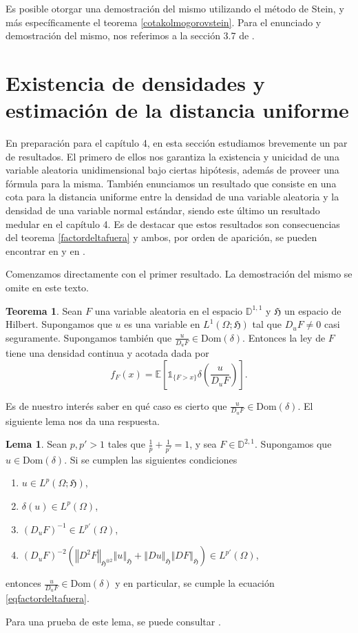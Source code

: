 \documentclass[letterpaper,twoside,12pt]{book}
\newcommand{\D}{\mathbb{D}}
\newcommand{\E}{\mathbb{E}}
\newcommand{\1}{\mathds{1}}
\newcommand{\norm}[1]{\left\Vert #1 \right\Vert}
\theoremstyle{definition}
\theoremstyle{definition}
\newtheorem{teo}{Teorema}
\theoremstyle{remark}
\theoremstyle{definition}
\theoremstyle{definition}
\theoremstyle{definition}
\theoremstyle{definition}
\theoremstyle{definition}
\newtheorem{lema}{Lema}
\begin{document}
Es posible otorgar una demostración del mismo utilizando el método de Stein, y más específicamente el teorema \ref{cotakolmogorovstein}. Para el enunciado y demostración del mismo, nos referimos a la sección 3.7 de \cite{Nourdin_Peccati_2012}.

\section{Existencia de densidades y estimación de la distancia uniforme}

En preparación para el capítulo 4, en esta sección estudiamos brevemente un par de resultados. El primero de ellos nos garantiza la existencia y unicidad de una variable aleatoria unidimensional bajo ciertas hipótesis, además de proveer una fórmula para la misma. También enunciamos un resultado que consiste en una cota para la distancia uniforme entre la densidad de una variable aleatoria y la densidad de una variable normal estándar, siendo este último un resultado medular en el capítulo 4. Es de destacar que estos resultados son consecuencias del teorema \ref{factordeltafuera} y ambos, por orden de aparición, se pueden encontrar en \cite[proposición 1]{Caballero1998-hz} y en \cite[teorema 3.2]{KUZGUN202268}.

Comenzamos directamente con el primer resultado. La demostración del mismo se omite en este texto.
\begin{teo}\label{existdensidad}
 Sean $F$ una variable aleatoria en el espacio $\D^{1,1}$ y $\mathfrak{H}$ un espacio de Hilbert. Supongamos que $u$ es una variable en $L^{1}(\Omega;\mathfrak{H})$ tal que $D_uF\neq 0$ casi seguramente. Supongamos también que $\tfrac{u}{D_uF}\in \text{Dom}(\delta)$. Entonces la ley de $F$ tiene una densidad continua y acotada dada por 
   \begin{equation}\label{formuladensidad}
      f_F(x)=\E\left[\1_{\{F>x\}}\delta \left(\frac{u}{D_uF}\right)\right].
   \end{equation}
 \end{teo}
Es de nuestro interés saber en qué caso es cierto que $\tfrac{u}{D_uF}\in \text{Dom}(\delta)$. El siguiente lema nos da una respuesta.

\begin{lema}\label{lemaexistdensidad}
 Sean $p,p'>1$ tales que $\frac{1}{p}+\frac{1}{p'}=1$, y sea $F\in \D^{2,1}$. Supongamos que $u\in \text{Dom}(\delta)$. Si se cumplen las siguientes condiciones 
 \begin{enumerate}
   \item $u\in L^{p}(\Omega;\mathfrak{H})$,
   \item $\delta(u)\in L^{p}(\Omega)$,
   \item $(D_uF)^{-1}\in L^{p'}(\Omega)$,
   \item $(D_uF)^{-2}\left(\norm{D^2F}_{\mathfrak{H}^{\otimes 2}}\norm{u}_{\mathfrak{H}}+\norm{Du}_{\mathfrak{H}}\norm{DF}_{\mathfrak{H}}\right)\in L^{p'}(\Omega)$,
 \end{enumerate}
 entonces $\tfrac{u}{D_uF}\in \text{Dom}(\delta)$ y en particular, se cumple la ecuación \eqref{eqfactordeltafuera}. 
 \end{lema}
 Para una prueba de este lema, se puede consultar \cite[lema 3, lema 4]{Caballero1998-hz}.
\end{document}
